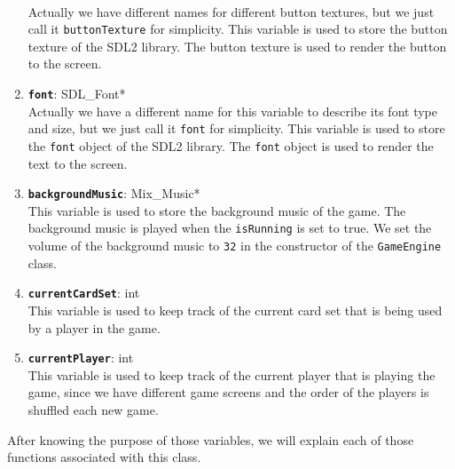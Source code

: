 \begin{enumerate}
    \\ Actually we have different names for different button textures, but we just call it \texttt{buttonTexture} for simplicity. This variable is used to store the button texture of the SDL2 library. The button texture is used to render the button to the screen.
    \item \textbf{\texttt{font}}: SDL\_Font*
    \\ Actually we have a different name for this variable to describe its font type and size, but we just call it \texttt{font} for simplicity. This variable is used to store the \texttt{font} object of the SDL2 library. The \texttt{font} object is used to render the text to the screen.  
    \item \textbf{\texttt{backgroundMusic}}: Mix\_Music*
    \\ This variable is used to store the background music of the game. The background music is played when the \texttt{isRunning} is set to true. We set the volume of the background music to \texttt{32} in the constructor of the \texttt{GameEngine} class.
    \item \textbf{\texttt{currentCardSet}}: int
    \\ This variable is used to keep track of the current card set that is being used by a player in the game.
    \item \textbf{\texttt{currentPlayer}}: int
    \\ This variable is used to keep track of the current player that is playing the game, since we have different game screens and the order of the players is shuffled each new game.
\end{enumerate}

\hspace{1cm} After knowing the purpose of those variables, we will explain each of those functions associated with this class.

